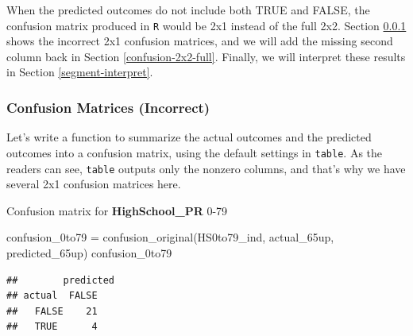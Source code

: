 \documentclass[
]{article}
\newenvironment{Shaded}{\begin{snugshade}}{\end{snugshade}}
\newcommand{\CommentTok}[1]{\textcolor[rgb]{0.56,0.35,0.01}{\textit{#1}}}
\newcommand{\ControlFlowTok}[1]{\textcolor[rgb]{0.13,0.29,0.53}{\textbf{#1}}}
\newcommand{\FloatTok}[1]{\textcolor[rgb]{0.00,0.00,0.81}{#1}}
\newcommand{\FunctionTok}[1]{\textcolor[rgb]{0.00,0.00,0.00}{#1}}
\newcommand{\NormalTok}[1]{#1}
\newcommand{\OtherTok}[1]{\textcolor[rgb]{0.56,0.35,0.01}{#1}}
\newcommand{\SpecialCharTok}[1]{\textcolor[rgb]{0.00,0.00,0.00}{#1}}
\begin{document}
When the predicted outcomes do not include both TRUE and FALSE, the
confusion matrix produced in \texttt{R} would be 2x1 instead of the full
2x2. Section \ref{confusion-2x1} shows the incorrect 2x1 confusion
matrices, and we will add the missing second column back in Section
\ref{confusion-2x2-full}. Finally, we will interpret these results in
Section \ref{segment-interpret}.

\hypertarget{confusion-2x1}{%
\subsubsection{Confusion Matrices (Incorrect)}\label{confusion-2x1}}

Let's write a function to summarize the actual outcomes and the
predicted outcomes into a confusion matrix, using the default settings
in \texttt{table}. As the readers can see, \texttt{table} outputs only
the nonzero columns, and that's why we have several 2x1 confusion
matrices here.

\begin{Shaded}
\end{Shaded}

Confusion matrix for \textbf{HighSchool\_PR} 0-79

\begin{Shaded}
\begin{Highlighting}[]
\NormalTok{confusion\_0to79 }\OtherTok{=} \FunctionTok{confusion\_original}\NormalTok{(HS0to79\_ind, actual\_65up, predicted\_65up)}
\NormalTok{confusion\_0to79}
\end{Highlighting}
\end{Shaded}

\begin{verbatim}
##        predicted
## actual  FALSE
##   FALSE    21
##   TRUE      4
\end{verbatim}
\end{document}
